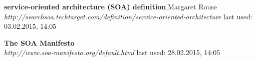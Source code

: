 \documentclass[12pt]{article}
\begin{document}
\begin{thebibliography}{56}
   \textbf{service-oriented architecture (SOA) definition},Margaret Rouse \\
  \textit{http://searchsoa.techtarget.com/definition/service-oriented-architecture}
  \newline last used: 03.02.2015, 14:05

 
   \textbf{The SOA Manifesto} \\
  \textit{http://www.soa-manifesto.org/default.html}
  \newline last used: 28.02.2015, 14:05


 
\end{thebibliography}
\end{document}
